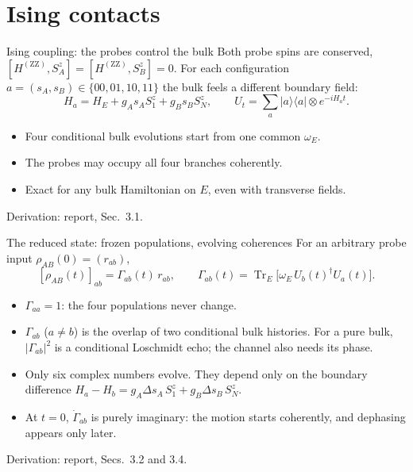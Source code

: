 \documentclass[aspectratio=169,11pt]{beamer}
\newcommand{\ket}[1]{\lvert #1\rangle}
\newcommand{\bra}[1]{\langle #1\rvert}
\newcommand{\Tr}{\operatorname{Tr}}
\newcommand{\ZZ}{\mathrm{ZZ}}
\newcommand{\report}[1]{{\color{muted}\footnotesize Derivation: report, #1.}}
\begin{document}
\section{Ising contacts}

\begin{frame}{Ising coupling: the probes control the bulk}
Both probe spins are conserved, $[H^{(\ZZ)},S_A^z]=[H^{(\ZZ)},S_B^z]=0$.
For each configuration $a=(s_A,s_B)\in\{00,01,10,11\}$ the bulk feels
a different boundary field:
\[
H_a=H_E+g_As_AS_1^z+g_Bs_BS_N^z,\qquad
\boxed{U_t=\sum_a\ket a\bra a\otimes e^{-iH_at}.}
\]
\begin{itemize}\setlength\itemsep{7pt}
\item Four conditional bulk evolutions start from one common $\omega_E$.
\item The probes may occupy all four branches coherently.
\item Exact for any bulk Hamiltonian on $E$, even with transverse fields.
\end{itemize}
\report{Sec.~3.1}
\end{frame}

\begin{frame}{The reduced state: frozen populations, evolving coherences}
For an arbitrary probe input $\rho_{AB}(0)=(r_{ab})$,
\[
\boxed{[\rho_{AB}(t)]_{ab}=\Gamma_{ab}(t)\,r_{ab},\qquad
\Gamma_{ab}(t)=\Tr_E\bigl[\omega_E\,U_b(t)^\dagger U_a(t)\bigr].}
\]
\begin{itemize}\setlength\itemsep{7pt}
\item $\Gamma_{aa}=1$: the four populations never change.
\item $\Gamma_{ab}$ ($a\ne b$) is the overlap of two conditional bulk
histories. For a pure bulk, $|\Gamma_{ab}|^2$ is a conditional Loschmidt echo;
the channel also needs its phase.
\item Only six complex numbers evolve. They depend only on the boundary
difference $H_a-H_b=g_A\Delta s_A\,S_1^z+g_B\Delta s_B\,S_N^z$.
\item At $t=0$, $\dot\Gamma_{ab}$ is purely imaginary: the motion starts
coherently, and dephasing appears only later.
\end{itemize}
\report{Secs.~3.2 and 3.4}
\end{frame}
\end{document}
